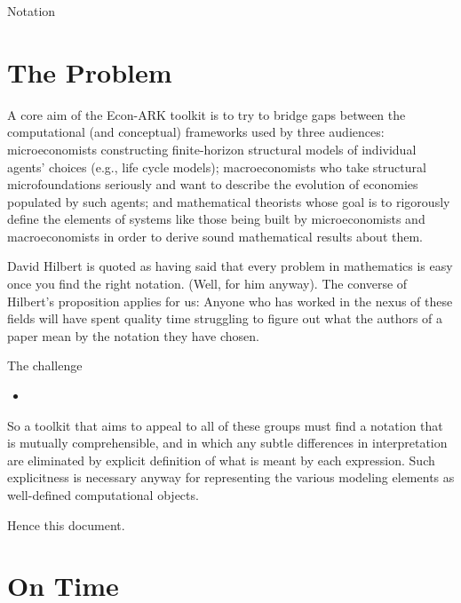 \documentclass[\econtexRoot/BufferStockTheory]{subfiles}
\begin{document}
\newcommand{\tnow}{t}

\centerline{\Large Notation}\label{sec:ontime}\hypertarget{ontime}{}

\section{The Problem}\label{sec:ontime}\hypertarget{ontime}{}

A core aim of the Econ-ARK toolkit is to try to bridge gaps between the computational (and conceptual) frameworks used by three audiences: microeconomists constructing finite-horizon structural models of individual agents' choices (e.g., life cycle models); macroeconomists who take structural microfoundations seriously and want to describe the evolution of economies populated by such agents; and mathematical theorists whose goal is to rigorously define the elements of systems like those being built by microeconomists and macroeconomists in order to derive sound mathematical results about them.

David Hilbert is quoted as having said that every problem in mathematics is easy once you find the right notation.  (Well, for him anyway).  The converse of Hilbert's proposition applies for us: Anyone who has worked in the nexus of these fields will have spent quality time struggling to figure out what the authors of a paper mean by the notation they have chosen.


The challenge
\begin{itemize}
\item 
\end{itemize}

So a toolkit that aims to appeal to all of these groups must find a notation that is mutually comprehensible, and in which any subtle differences in interpretation are eliminated by explicit definition of what is meant by each expression.  Such explicitness is necessary anyway for representing the various modeling elements as well-defined computational objects.

Hence this document.

\section{On Time}
\end{document}
